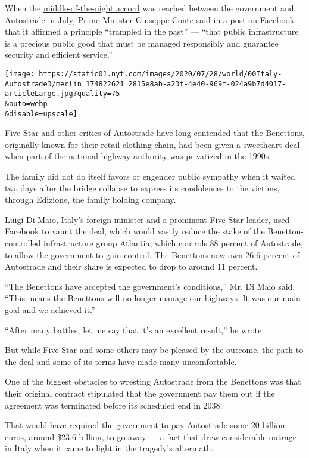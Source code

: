 When the
\href{http://www.governo.it/it/articolo/consiglio-dei-ministri-n-56/14926}{middle-of-the-night
accord} was reached between the government and Autostrade in July, Prime
Minister Giuseppe Conte said in a post on Facebook that it affirmed a
principle ``trampled in the past'' --- ``that public infrastructure is a
precious public good that must be managed responsibly and guarantee
security and efficient service.''

\texttt{[image: https://static01.nyt.com/images/2020/07/28/world/00Italy-Autostrade3/merlin\_174822621\_2815e8ab-a23f-4e40-969f-024a9b7d4017-articleLarge.jpg?quality=75\\\&auto=webp\\\&disable=upscale]}

Five Star and other critics of Autostrade have long contended that the
Benettons, originally known for their retail clothing chain, had been
given a sweetheart deal when part of the national highway authority was
privatized in the 1990s.

The family did not do itself favors or engender public sympathy when it
waited two days after the bridge collapse to express its condolences to
the victims, through Edizione, the family holding company.

Luigi Di Maio, Italy's foreign minister and a prominent Five Star
leader, used Facebook to vaunt the deal, which would vastly reduce the
stake of the Benetton-controlled infrastructure group Atlantia, which
controls 88 percent of Autostrade, to allow the government to gain
control. The Benettons now own 26.6 percent of Autostrade and their
share is expected to drop to around 11 percent.

``The Benettons have accepted the government's conditions,'' Mr. Di Maio
said. ``This means the Benettons will no longer manage our highways. It
was our main goal and we achieved it.''

``After many battles, let me say that it's an excellent result,'' he
wrote.

But while Five Star and some others may be pleased by the outcome, the
path to the deal and some of its terms have made many uncomfortable.

One of the biggest obstacles to wresting Autostrade from the Benettons
was that their original contract stipulated that the government pay them
out if the agreement was terminated before its scheduled end in 2038.

That would have required the government to pay Autostrade some 20
billion euros, around \$23.6 billion, to go away --- a fact that drew
considerable outrage in Italy when it came to light in the tragedy's
aftermath.


